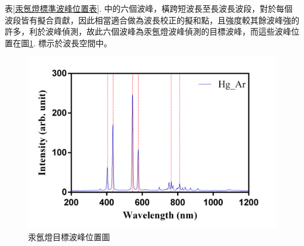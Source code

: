 \par
表\ref{汞氬燈標準波峰位置表}. 中的六個波峰，橫跨短波長至長波長波段，對於每個波段皆有擬合貢獻，因此相當適合做為波長校正的擬和點，且強度較其餘波峰強的許多，利於波峰偵測，故此六個波峰為汞氬燈波峰偵測的目標波峰，而這些波峰位置在圖\ref{汞氬燈目標波峰位置圖}. 標示於波長空間中。
\begin{figure}[H] %
	\centering %
	\vspace{0.8cm} 
	\setlength{\abovecaptionskip}{0.cm}
	\includegraphics[width=\textwidth]{figures/HgAr_Wavelength.png} %
	\caption{汞氬燈目標波峰位置圖} %
	\label{汞氬燈目標波峰位置圖} %
\end{figure}
\newpage

